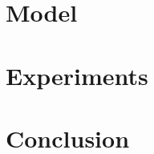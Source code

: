 \documentclass[11pt]{article}
\begin{document}
\section{Model}



\section{Experiments}

\section{Conclusion}


\end{document}
